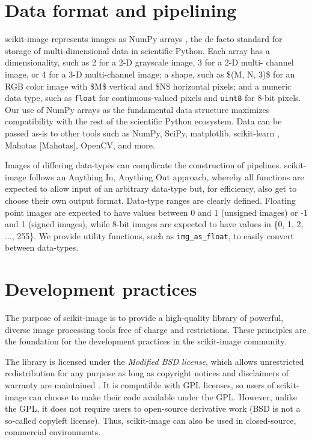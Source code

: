 \documentclass[fleqn,12pt]{wlpeerj}
\begin{document}
\section*{Data format and pipelining}
  \label{data-format-and-pipelining}

scikit-image represents images as NumPy arrays \cite{numpy}, the de facto standard
for storage of multi-dimensional data in scientific Python. Each array has a
dimensionality, such as 2 for a 2-D grayscale image, 3 for a 2-D multi-
channel image, or 4 for a 3-D multi-channel image; a shape, such as \$(M, N, 3)\$
for an RGB color image with \$M\$ vertical and \$N\$ horizontal pixels; and a
numeric data type, such as \texttt{float} for continuous-valued pixels and \texttt{uint8}
for 8-bit pixels. Our use of NumPy arrays as the fundamental data structure
maximizes compatibility with the rest of the scientific Python ecosystem.
Data can be passed as-is to other tools such as NumPy, SciPy, matplotlib,
scikit-learn \cite{scikit-learn}, Mahotas {[}Mahotas{]}, OpenCV, and more.

Images of differing data-types can complicate the construction of pipelines.
scikit-image follows an \textquotedbl{}Anything In, Anything Out\textquotedbl{} approach, whereby all
functions are expected to allow input of an arbitrary data-type but, for
efficiency, also get to choose their own output format. Data-type
ranges are clearly defined. Floating point images are expected to have
values between 0 and 1 (unsigned images) or -1 and 1 (signed images), while
8-bit images are expected to have values in \{0, 1, 2, ..., 255\}. We provide
utility functions, such as \texttt{img\_as\_float}, to easily convert between
data-types.

\section*{Development practices}
  \label{development-practices}

The purpose of scikit-image is to provide a high-quality library of powerful,
diverse image processing tools free of charge and restrictions. These
principles are the foundation for the development practices in the scikit-image
community.

The library is licensed under the \emph{Modified BSD license}, which allows
unrestricted redistribution for any purpose as long as copyright notices
and disclaimers of warranty are maintained \cite{BSD}. It is compatible with GPL
licenses, so users of scikit-image can choose to make their code available
under the GPL. However, unlike the GPL, it does not require users to
open-source derivative work (BSD is not a so-called copyleft license). Thus,
scikit-image can also be used in closed-source, commercial environments.
\end{document}
